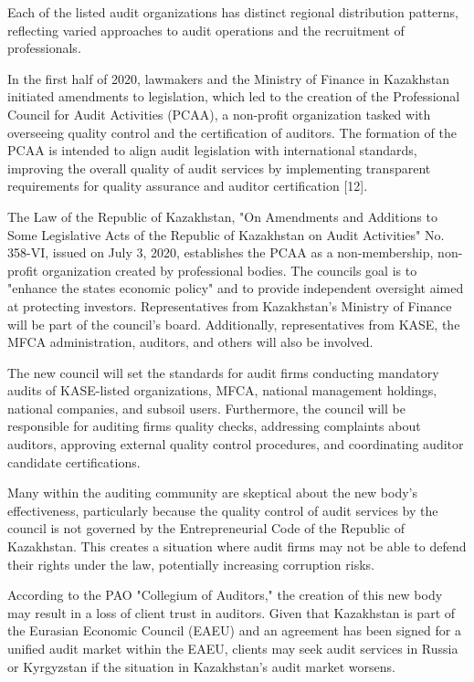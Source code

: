 \begin{multicols}{2}

Each of the listed audit organizations has distinct regional
distribution patterns, reflecting varied approaches to audit operations
and the recruitment of professionals.

In the first half of 2020, lawmakers and the Ministry of Finance in
Kazakhstan initiated amendments to legislation, which led to the
creation of the Professional Council for Audit Activities (PCAA), a
non-profit organization tasked with overseeing quality control and the
certification of auditors. The formation of the PCAA is intended to
align audit legislation with international standards, improving the
overall quality of audit services by implementing transparent
requirements for quality assurance and auditor certification {[}12{]}.

The Law of the Republic of Kazakhstan, "On Amendments and Additions to
Some Legislative Acts of the Republic of Kazakhstan on Audit Activities"
No. 358-VI, issued on July 3, 2020, establishes the PCAA as a
non-membership, non-profit organization created by professional bodies.
The council\textquotesingle s goal is to "enhance the
state\textquotesingle s economic policy" and to provide independent
oversight aimed at protecting investors. Representatives from
Kazakhstan's Ministry of Finance will be part of the council's board.
Additionally, representatives from KASE, the MFCA administration,
auditors, and others will also be involved.

The new council will set the standards for audit firms conducting
mandatory audits of KASE-listed organizations, MFCA, national management
holdings, national companies, and subsoil users. Furthermore, the
council will be responsible for auditing firms\textquotesingle{} quality
checks, addressing complaints about auditors, approving external quality
control procedures, and coordinating auditor candidate certifications.

Many within the auditing community are skeptical about the new body's
effectiveness, particularly because the quality control of audit
services by the council is not governed by the Entrepreneurial Code of
the Republic of Kazakhstan. This creates a situation where audit firms
may not be able to defend their rights under the law, potentially
increasing corruption risks.

According to the PAO "Collegium of Auditors," the creation of this new
body may result in a loss of client trust in auditors. Given that
Kazakhstan is part of the Eurasian Economic Council (EAEU) and an
agreement has been signed for a unified audit market within the EAEU,
clients may seek audit services in Russia or Kyrgyzstan if the situation
in Kazakhstan's audit market worsens.


\end{multicols}
